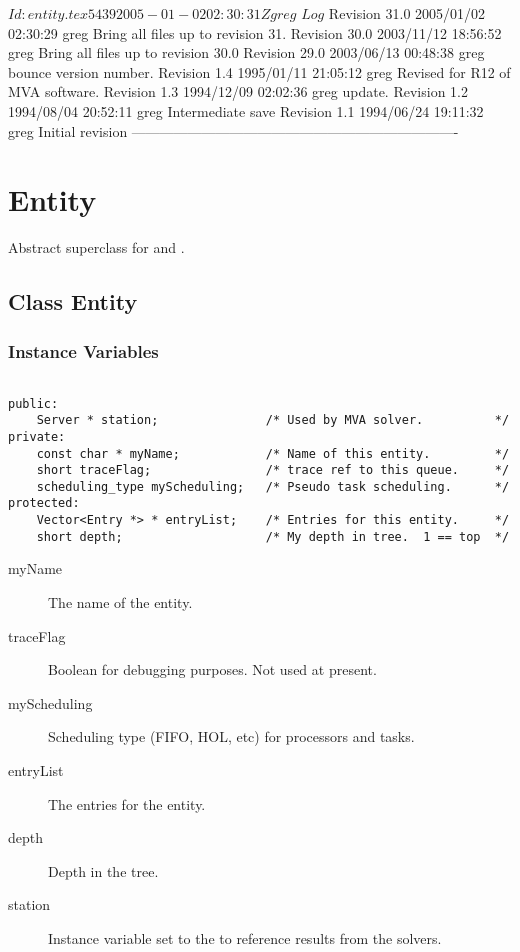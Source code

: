 \C 
\C $Id: entity.tex 5439 2005-01-02 02:30:31Z greg $
\C 
\C $Log$
\C Revision 31.0  2005/01/02 02:30:29  greg
\C Bring all files up to revision 31.
\C
\C Revision 30.0  2003/11/12 18:56:52  greg
\C Bring all files up to revision 30.0
\C
\C Revision 29.0  2003/06/13 00:48:38  greg
\C bounce version number.
\C
\C Revision 1.4  1995/01/11 21:05:12  greg
\C Revised for R12 of MVA software.
\C
\C Revision 1.3  1994/12/09  02:02:36  greg
\C update.
\C
\C Revision 1.2  1994/08/04  20:52:11  greg
\C Intermediate save
\C
\C Revision 1.1  1994/06/24  19:11:32  greg
\C Initial revision
\C
\C ----------------------------------------------------------------------
\section{Entity}
\label{sec:entity}

Abstract superclass for  and
. 

\subsection{Class Entity}
\subsubsection{Instance Variables}
\label{sec:entity-ivars}

\begin{verbatim}

public:
    Server * station;               /* Used by MVA solver.          */
private:
    const char * myName;            /* Name of this entity.         */
    short traceFlag;                /* trace ref to this queue.     */
    scheduling_type myScheduling;   /* Pseudo task scheduling.      */
protected:
    Vector<Entry *> * entryList;    /* Entries for this entity.     */
    short depth;                    /* My depth in tree.  1 == top  */
\end{verbatim}

\begin{description}
\item[myName] \texonly{---} The name of the entity.
\item[traceFlag] \texonly{---} Boolean for debugging purposes.  Not
  used at present.
\item[myScheduling] \texonly{---} Scheduling type (FIFO, HOL, etc) for
  processors and tasks.
\item[entryList] \texonly{---} The entries for the entity.
\item[depth] \texonly{---} Depth in the tree.
\item[station] \texonly{---} Instance variable set to the
   to reference results from the
   solvers.
\end{description}

